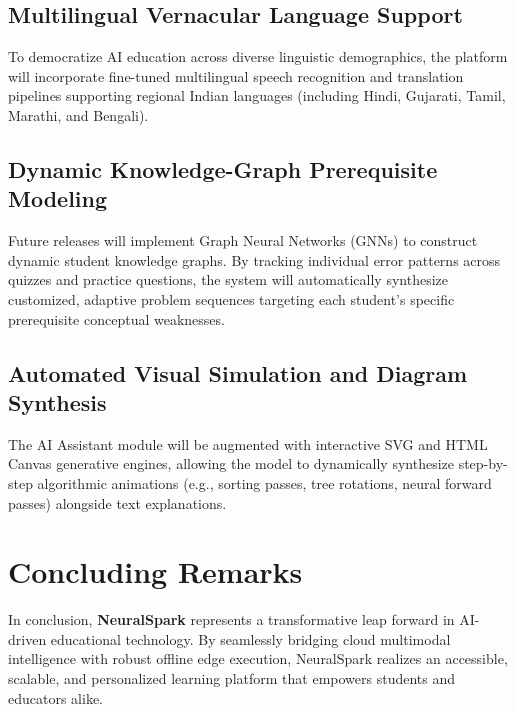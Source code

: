 \subsection{Multilingual Vernacular Language Support}
To democratize AI education across diverse linguistic demographics, the platform will incorporate fine-tuned multilingual speech recognition and translation pipelines supporting regional Indian languages (including Hindi, Gujarati, Tamil, Marathi, and Bengali).

\subsection{Dynamic Knowledge-Graph Prerequisite Modeling}
Future releases will implement Graph Neural Networks (GNNs) to construct dynamic student knowledge graphs. By tracking individual error patterns across quizzes and practice questions, the system will automatically synthesize customized, adaptive problem sequences targeting each student's specific prerequisite conceptual weaknesses.

\subsection{Automated Visual Simulation and Diagram Synthesis}
The AI Assistant module will be augmented with interactive SVG and HTML Canvas generative engines, allowing the model to dynamically synthesize step-by-step algorithmic animations (e.g., sorting passes, tree rotations, neural forward passes) alongside text explanations.

\section{Concluding Remarks}
In conclusion, \textbf{NeuralSpark} represents a transformative leap forward in AI-driven educational technology. By seamlessly bridging cloud multimodal intelligence with robust offline edge execution, NeuralSpark realizes an accessible, scalable, and personalized learning platform that empowers students and educators alike.
